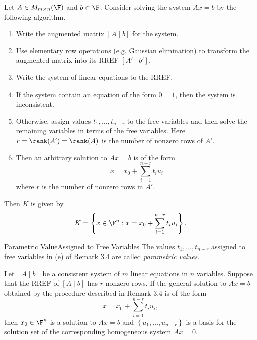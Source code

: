 \documentclass[linearalgebra]{subfiles}
\begin{document}
    \begin{remark}
        Let $A\in M_{m\times n}(\F)$ and $b\in \F$. Consider solving the system $Ax=b$ by the following algorithm.
        \begin{enumerate}
            \item Write the augmented matrix $[A\mid b]$ for the system.
            \item Use elementary row operations (e.g. Gaussian elimination) to transform the augmented matrix into its RREF $[A'\mid b']$.
            \item Write the system of linear equations to the RREF.
            \item If the system contain an equation of the form $0=1$, then the system is inconsistent.
            \item Otherwise, assign values $t_1, \ldots, t_{n-r}$ to the free variables and then solve the remaining variables in terms of the free variables. Here $r = \rank(A') = \rank(A)$ is the number of nonzero rows of $A'$.
            \item Then an arbitrary solution to $Ax=b$ is of the form
                \begin{equation*}
                    x = x_0 + \sum^{n-r}_{i=1} t_iu_i
                \end{equation*}
                where $r$ is the number of nonzero rows in $A'$.
        \end{enumerate}
        Then $K$ is given by
        \begin{equation*}
            K = \left\lbrace x\in \F^n: x = x_0 + \sum^{n-r}_{i=1} t_iu_i \right\rbrace. 
        \end{equation*}
    \end{remark}

    \begin{definition}{Parametric Value}{Assigned to Free Variables}
        The values $t_1, \ldots, t_{n-r}$ assigned to free variables in (e) of Remark 3.4 are called \emph{parametric values}.
    \end{definition}

    \begin{prop}{}
        Let $[A\mid b]$ be a consistent system of $m$ linear equations in $n$ variables. Suppose that the RREF of $[A\mid b]$ has $r$ nonzero rows. If the general solution to $Ax=b$ obtained by the procedure described in Remark 3.4 is of the form
        \begin{equation*}
            x = x_0 + \sum^{n-r}_{i=1} t_iu_i,
        \end{equation*}
        then $x_0\in \F^n$ is a solution to $Ax=b$ and $\left\lbrace u_1, \ldots, u_{n-r} \right\rbrace$ is a basis for the solution set of the corresponding homogeneous system $Ax = 0$.
    \end{prop}
\end{document}
